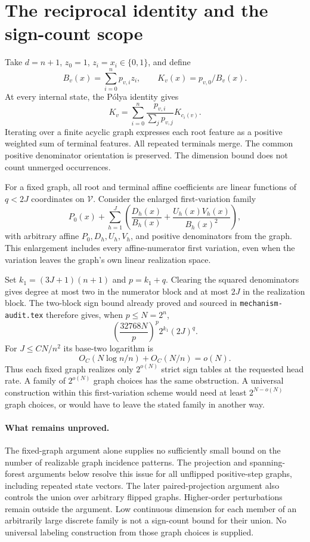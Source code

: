 \documentclass[11pt]{article}
\begin{document}
\section{The reciprocal identity and the sign-count scope}

Take $d=n+1$, $z_0=1$, $z_i=x_i\in\{0,1\}$, and define
\[
                B_v(x)=\sum_{i=0}^n p_{v,i}z_i,
                \qquad K_v(x)=p_{v,0}/B_v(x).
\]
At every internal state, the P\'olya identity gives
\[
            K_v=\sum_{i=0}^n\frac{p_{v,i}}{\sum_j p_{v,j}}K_{c_i(v)}.
 \tag{6}
\]
Iterating over a finite acyclic graph expresses each root feature as
a positive weighted sum of terminal features. All repeated terminals
merge. The common positive denominator orientation is preserved.
The dimension bound does not count unmerged occurrences.

For a fixed graph, all root and terminal affine coefficients are
linear functions of $q<2J$ coordinates on $\mathcal V$. Consider the
enlarged first-variation family
\[
 P_0(x)+\sum_{h=1}^J\left(\frac{D_h(x)}{B_h(x)}
                         +\frac{U_h(x)V_h(x)}{B_h(x)^2}\right),
 \tag{7}
\]
with arbitrary affine $P_0,D_h,U_h,V_h$, and positive denominators
from the graph. This enlargement includes every affine-numerator
first variation, even when the variation leaves the graph's own
linear realization space.

Set $k_1=(3J+1)(n+1)$ and $p=k_1+q$. Clearing the squared
denominators gives degree at most two in the numerator block and
at most $2J$ in the realization block. The two-block sign bound
already proved and sourced in \texttt{mechanism-audit.tex} therefore
gives, when $p\le N=2^n$,
\[
                 \left(\frac{32768N}{p}\right)^p
                           2^{k_1}(2J)^q.
 \tag{8}
\]
For $J\le C N/n^2$ its base-two logarithm is
\[
                 O_C(N\log n/n)+O_C(N/n)=o(N).
 \tag{9}
\]
Thus each fixed graph realizes only $2^{o(N)}$ strict sign tables
at the requested head rate. A family of $2^{o(N)}$ graph choices
has the same obstruction. A universal construction within this
first-variation scheme would need at least $2^{N-o(N)}$ graph
choices, or would have to leave the stated family in another way.

\paragraph{What remains unproved.}
The fixed-graph argument alone supplies no sufficiently small bound on
the number of realizable graph incidence patterns. The projection and
spanning-forest arguments below resolve this issue for all unflipped
positive-step graphs, including repeated state vectors. The later paired-projection argument also controls the union over
arbitrary flipped graphs. Higher-order perturbations remain outside
the argument.
Low continuous dimension for each member of an arbitrarily large
discrete family is not a sign-count bound for their union. No
universal labeling construction from those graph choices is supplied.
\end{document}
